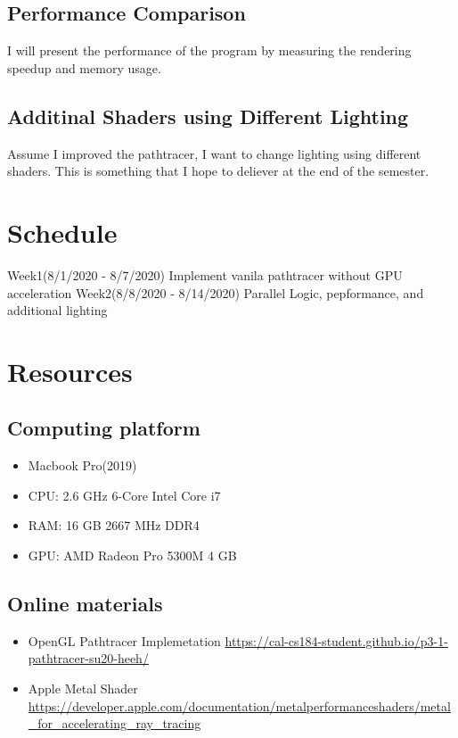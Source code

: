 \documentclass[11pt]{article}
\begin{document}
\subsection*{Performance Comparison}
\label{sec:org4f0d9f1}
I will present the performance of the program by measuring the
rendering speedup and memory usage.

\subsection*{Additinal Shaders using Different Lighting}
\label{sec:orgf93439d}
Assume I improved the pathtracer, I want to change lighting using different shaders.
This is something that I hope to deliever at the end of the semester.

\section*{Schedule}
\label{sec:orgf3b40f5}
Week1(8/1/2020 - 8/7/2020) Implement vanila pathtracer without GPU acceleration
Week2(8/8/2020 - 8/14/2020) Parallel Logic, pepformance, and additional lighting

\section*{Resources}
\label{sec:org7766bdb}
\subsection*{Computing platform}
\label{sec:orgea31ab6}
\begin{itemize}
\item Macbook Pro(2019)
\item CPU: 2.6 GHz 6-Core Intel Core i7
\item RAM: 16 GB 2667 MHz DDR4
\item GPU: AMD Radeon Pro 5300M 4 GB
\end{itemize}
\subsection*{Online materials}
\label{sec:org04bec7b}
\begin{itemize}
\item OpenGL Pathtracer Implemetation \url{https://cal-cs184-student.github.io/p3-1-pathtracer-su20-heeh/}
\item Apple Metal Shader \url{https://developer.apple.com/documentation/metalperformanceshaders/metal\_for\_accelerating\_ray\_tracing}
\end{itemize}
\end{document}

